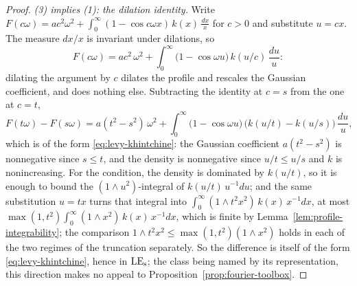 \begin{proof}
\emph{(3) implies (1): the dilation identity.} Write
$F(c\omega) = ac^2\omega^2 + \int_0^\infty (1 - \cos c\omega x)\,k(x)\,\frac{dx}{x}$ for
$c > 0$ and substitute $u = cx$. The measure $dx/x$ is invariant under dilations, so
\[
  F(c\omega) = a c^2\,\omega^2
   + \int_0^\infty \bigl(1 - \cos\omega u\bigr)\,k(u/c)\,\frac{du}{u} :
\]
dilating the argument by $c$ dilates the profile and rescales the Gaussian coefficient, and
does nothing else. Subtracting the identity at $c = s$ from the one at $c = t$,
\begin{equation}\label{eq:dilation-difference}
  F(t\omega) - F(s\omega) = a(t^2 - s^2)\,\omega^2
   + \int_0^\infty \bigl(1 - \cos\omega u\bigr)\,\bigl(k(u/t) - k(u/s)\bigr)\,\frac{du}{u},
\end{equation}
which is of the form \ref{eq:levy-khintchine}: the Gaussian coefficient $a(t^2-s^2)$ is
nonnegative since $s \le t$, and the density is nonnegative since $u/t \le u/s$ and $k$ is
nonincreasing. For the \Levy{} condition, the density is dominated by $k(u/t)$, so it is enough
to bound the $(1 \wedge u^2)$-integral of $k(u/t)\,u^{-1}du$; and the same substitution
$u = tx$ turns that integral into $\int_0^\infty (1 \wedge t^2x^2)\,k(x)\,x^{-1}dx$, at most
$\max(1,t^2)\int_0^\infty (1 \wedge x^2)\,k(x)\,x^{-1}dx$, which is finite by
Lemma~\ref{lem:profile-integrability}; the comparison
$1 \wedge t^2x^2 \le \max(1,t^2)(1 \wedge x^2)$ holds in each of the two regimes of the
truncation separately. So the difference is itself of the form \ref{eq:levy-khintchine},
hence in $\mathrm{LE}_{\mathrm{s}}$; the class being named by its representation, this direction makes no appeal
to Proposition~\ref{prop:fourier-toolbox}.


\end{proof}
